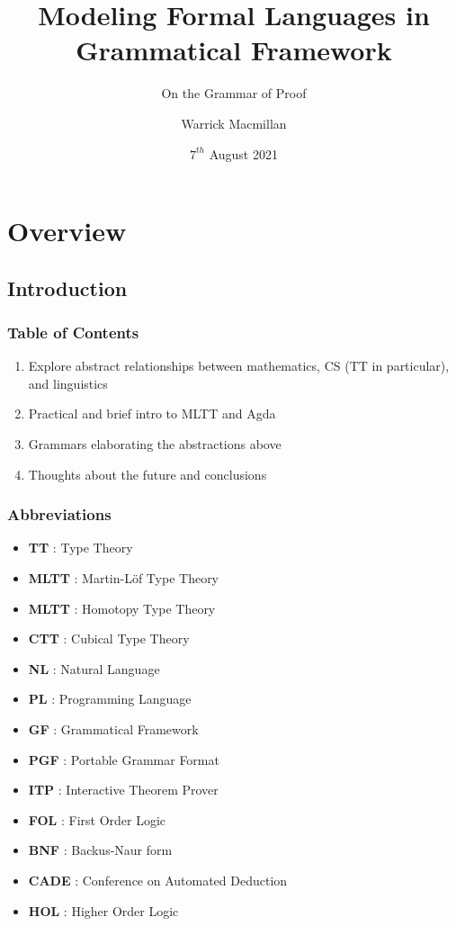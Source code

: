 \documentclass[10pt]{beamer}
\title{Modeling Formal Languages in Grammatical Framework}
\subtitle{On the Grammar of Proof}
\author{Warrick Macmillan}
\date{$7^{th}$ August 2021}
\begin{document}
\begin{frame}
  \titlepage
\end{frame}



\section{Overview}

\subsection{Introduction}


\begin{frame}
\frametitle{Table of Contents}

\begin{enumerate}

\item Explore abstract relationships between mathematics, CS (TT in
  particular), and linguistics
\item Practical and brief intro to MLTT and Agda
\item Grammars elaborating the abstractions above
\item Thoughts about the future and conclusions
\end{enumerate}
\end{frame}

\begin{frame}
\frametitle{Abbreviations}
\begin{itemize}
\item \textbf{TT} : Type Theory
\item \textbf{MLTT} : Martin-Löf Type Theory
\item \textbf{MLTT} : Homotopy Type Theory
\item \textbf{CTT} : Cubical Type Theory
\item \textbf{NL} : Natural Language
\item \textbf{PL} : Programming Language
\item \textbf{GF} : Grammatical Framework
\item \textbf{PGF} : Portable Grammar Format
\item \textbf{ITP} : Interactive Theorem Prover
\item \textbf{FOL} : First Order Logic
\item \textbf{BNF} : Backus-Naur form
\item \textbf{CADE} : Conference on Automated Deduction
\item \textbf{HOL} : Higher Order Logic
\end{itemize}
\end{frame}
\end{document}
